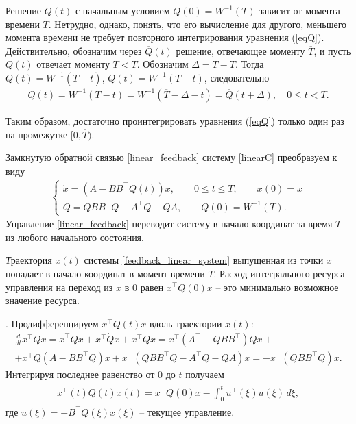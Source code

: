 \documentclass[../main.tex]{subfiles}
\begin{document}
	
	Решение $Q(t)$ с начальным условием $Q(0)=W^{-1}(T)$ зависит от момента времени $T$. Нетрудно, однако, понять, что его вычисление для другого, меньшего момента времени не требует повторного интегрирования уравнения (\ref{eqQ}). Действительно, обозначим через $\overline{Q}(t)$ решение, отвечающее моменту $\overline{T}$, и пусть  $Q(t)$ отвечает моменту $T<\overline{T}$. Обозначим $\Delta = \overline{T}-T$. Тогда $\overline{Q}(t)=W^{-1}(\overline{T}-t)$,  $ Q(t)=W^{-1}(T-t)$, следовательно 
	\begin{gather*}
	Q(t)=W^{-1}(T-t)=W^{-1}(\overline{T}-\Delta-t)= \overline{Q}(t+\Delta), \quad 0\leqslant t <T.
	\end{gather*}
	
	Таким образом, достаточно проинтегрировать уравнения (\ref{eqQ}) только один раз на промежутке $[0,\overline{T})$.
	
	Замкнутую обратной связью \eqref{linear_feedback} систему \eqref{linearC} преобразуем к виду
	\begin{gather}\label{feedback_linear_system}
		\left\lbrace \begin{array}{l}
				\dot{x} = (A - B B^{\top} Q(t) ) x, \qquad 0 \leqslant t \leqslant T, \qquad x(0) = x\\
				\dot{Q} = Q B B^{\top} Q - A^{\top}Q - Q A, \qquad Q(0) = W^{-1}(T).
			\end{array} \right. 
		\end{gather}
	 Управление  \eqref{linear_feedback}
		переводит систему в начало координат за время $T$ из любого начального состояния.
	\begin{utv}
		{\textit Траектория $x(t) $ системы {\rm \eqref{feedback_linear_system}} выпущенная из точки $ x $ попадает в начало координат в момент времени $T$. Расход интегрального ресурса управления на переход из $ x $ в $ 0 $ равен $x^{\top} Q(0) x $ -- это минимально возможное значение ресурса}.
	\end{utv}
	\doc. 
		Продифференцируем $x^{\top} Q(t) x$ вдоль траектории $ x(t) $:
		\begin{gather*}
			\frac{d}{dt} x^{\top} Q x = \dot{x}^{\top} Q x + x^{\top} \dot{Q} x + x^{\top} Q \dot{x} = x^{\top} (A^{\top} - Q B B^{\top} )Q x + \\ + x^{\top} Q (A - B B^{\top} Q)x + x^{\top} (Q B B^{\top} Q - A^{\top}Q - Q A) x = 
			-x^{\top} (Q B B^{\top} Q) x.
		\end{gather*}
		Интегрируя последнее равенство от $ 0 $ до $ t $ получаем
		\begin{gather}\label{xqx}
			\begin{gathered}
				x^{\top}(t) Q(t)x(t) = 
				x^{\top} Q(0)x - \int_{0}^{t} u^{\top}(\xi)  u(\xi) \, d\xi,
			\end{gathered}
		\end{gather}
	где $ u(\xi) = -B^{\top} Q(\xi) x(\xi)$ -- текущее управление.
	
\end{document}
